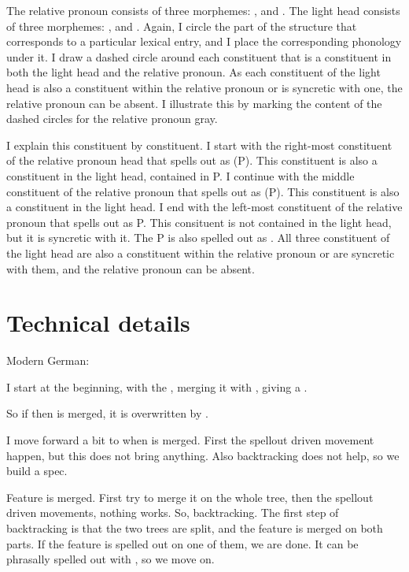 The relative pronoun consists of three morphemes: ,  and .
The light head consists of three morphemes: ,  and .
Again, I circle the part of the structure that corresponds to a particular lexical entry, and I place the corresponding phonology under it.
I draw a dashed circle around each constituent that is a constituent in both the light head and the relative pronoun.
As each constituent of the light head is also a constituent within the relative pronoun or is syncretic with one, the relative pronoun can be absent. I illustrate this by marking the content of the dashed circles for the relative pronoun gray.

I explain this constituent by constituent.
I start with the right-most constituent of the relative pronoun head that spells out as  (P). This constituent is also a constituent in the light head, contained in P.
I continue with the middle constituent of the relative pronoun that spells out as  (P). This constituent is also a constituent in the light head.
I end with the left-most constituent of the relative pronoun that spells out as  {P}. This consituent is not contained in the light head, but it is syncretic with it. The P is also spelled out as .
All three constituent of the light head are also a constituent within the relative pronoun or are syncretic with them, and the relative pronoun can be absent.







\section{Technical details}

Modern German:

I start at the beginning, with the , merging it with , giving a .

So if then  is merged, it is overwritten by .

I move forward a bit to when  is merged. First the spellout driven movement happen, but this does not bring anything. Also backtracking does not help, so we build a spec.

Feature  is merged. First try to merge it on the whole tree, then the spellout driven movements, nothing works. So, backtracking. The first step of backtracking is that the two trees are split, and the feature is merged on both parts. If the feature is spelled out on one of them, we are done. It can be phrasally spelled out with , so we move on.

